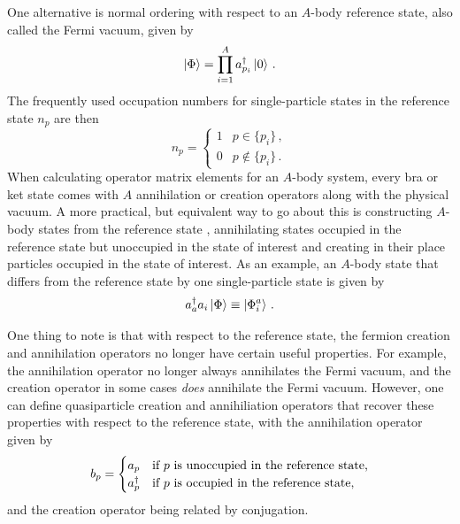 One alternative is normal ordering with respect to an $A$-body reference state,
also called the Fermi vacuum,
given by
\begin{equation}\label{eq:ref_state_defintion}
  \ket{\Phi} = \prod_{i=1}^A a_{p_i}^{\dagger} \ket{0}\,.
\end{equation}
The frequently used occupation numbers for single-particle states in the reference state $n_p$
are then
\begin{equation}
  n_p =
  \begin{cases}
    1 & p \in \{p_i\}\,, \\
    0 & p \not\in \{p_i\}\,.
  \end{cases}
\end{equation}
When calculating operator matrix elements for an $A$-body system,
every bra or ket state comes with $A$ annihilation or creation operators
along with the physical vacuum.
A more practical, but equivalent way to go about this is constructing
$A$-body states from the reference state ,
annihilating states occupied in the reference state but unoccupied in the state of interest
and creating in their place particles occupied in the state of interest.
As an example, an $A$-body state that differs from the reference state
by one single-particle state is given by
\begin{equation}
  a_{a}^{\dagger} a_{i} \ket{\Phi} \equiv \ket{\Phi_{i}^{a}}\,.
\end{equation}

One thing to note is that with respect to the reference state,
the fermion creation and annihilation operators no longer have certain useful properties.
For example, the annihilation operator no longer always annihilates the Fermi vacuum,
and the creation operator in some cases \textit{does} annihilate the Fermi vacuum.
However, one can define quasiparticle creation and annihiliation operators
that recover these properties with respect to the reference state,
with the annihilation operator given by
\begin{equation}
  b_{p} =
  \begin{cases}
    a_{p} & \text{if $p$ is unoccupied in the reference state,} \\
    a_{p}^{\dagger} & \text{if $p$ is occupied in the reference state,}
  \end{cases}
\end{equation}
and the creation operator being related by conjugation.


